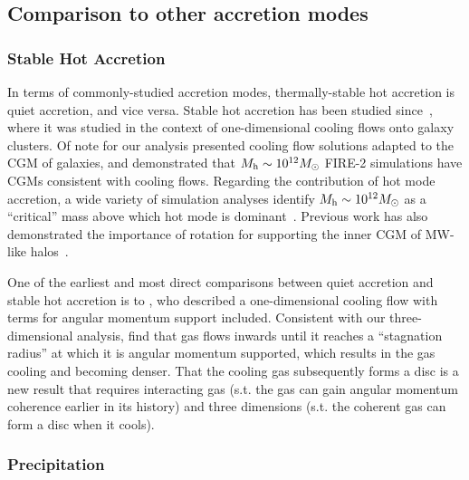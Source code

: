\documentclass[fleqn,usenatbib]{mnras}
\begin{document}
\subsection{Comparison to other accretion modes}
\label{s: modes}

\subsubsection{Stable Hot Accretion}
\label{s: modes -- hot}

In terms of commonly-studied accretion modes, thermally-stable hot accretion is quiet accretion, and vice versa.
Stable hot accretion has been studied since~\cite{Cowie1977a}, where it was studied in the context of one-dimensional cooling flows onto galaxy clusters.
Of note for our analysis \cite{Stern2019} presented cooling flow solutions adapted to the CGM of galaxies, and \cite{Stern2020} demonstrated that $M_{\rm h} \sim 10^{12} M_\odot$ FIRE-2 simulations have CGMs consistent with cooling flows.
Regarding the contribution of hot mode accretion, a wide variety of simulation analyses identify $M_{\rm h} \sim 10^{12} M_\odot$ as a ``critical'' mass above which hot mode is dominant~\citep[e.g.][, and many others]{Correa2017, Stern2020}.
Previous work has also demonstrated the importance of rotation for supporting the inner CGM of MW-like halos~\citep{Oppenheimer2018}.

One of the earliest and most direct comparisons between quiet accretion and stable hot accretion is to \cite{Cowie1980}, who described a one-dimensional cooling flow with terms for angular momentum support included.
Consistent with our three-dimensional analysis, \citeauthor{Cowie1980} find that gas flows inwards until it reaches a ``stagnation radius'' at which it is angular momentum supported, which results in the gas cooling and becoming denser.
That the cooling gas subsequently forms a disc is a new result that requires interacting gas (s.t. the gas can gain angular momentum coherence earlier in its history) and three dimensions (s.t. the coherent gas can form a disc when it cools).

\subsubsection{Precipitation}
\label{s: modes -- precipitation}
\end{document}
